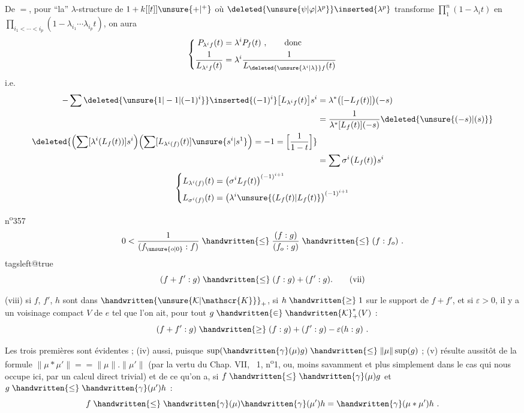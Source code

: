 De $=$, pour ``la'' $\lambda$-structure de $1+k[[t]]\unsure{+|{}^{+}}$ où $\deleted{\unsure{\psi|\varphi|\lambda^p}}\inserted{\lambda^p}$ transforme $\prod_{1}^{n}(1-\lambda_i t)$ en $\prod_{i_1<\cdots<i_p}(1-\lambda_{i_1}\cdots\lambda_{i_p}t)$, on aura
\[
\left\{\begin{aligned}
P_{\lambda^i f}(t)&=\lambda^i P_f(t)\ ,\qquad\text{donc}\\
\frac{1}{L_{\lambda^i f}(t)}&=\lambda^i\frac{1}{L_{\deleted{\unsure{\lambda^i|\lambda}}f}(t)}
\end{aligned}\right.
\]
i.e.
\[
\begin{aligned}
-\sum\deleted{\unsure{1|-1|(-1)^i}}\inserted{(-1)^i}\bigl[L_{\lambda^i f}(t)\bigr]s^i
 &=\lambda^\ast\bigl([-L_f(t)]\bigr)(-s)\\
 &=\frac{1}{\lambda^\ast[L_f(t)](-s)}\deleted{\unsure{(-s)|(s)}}\\
\deleted{\Bigl(\sum[\lambda^i(L_f(t))]s^i\Bigr)\Bigl(\sum[L_{\lambda^i(f)}(t)]\unsure{s^i|s^1}\Bigr)=-1=\Bigl[\frac{1}{1-t}\Bigr]}&\\
 &=\sum\sigma^i\bigl(L_f(t)\bigr)s^i
\end{aligned}
\]
\[
\left\{\begin{aligned}
L_{\lambda^i(f)}(t)&=\bigl(\sigma^i L_f(t)\bigr)^{(-1)^{i+1}}\\
L_{\sigma^i(f)}(t)&=\bigl(\lambda^i\unsure{(L_f(t)|L_f(t)}\bigr)^{(-1)^{i+1}}
\end{aligned}\right.
\]

n\textsuperscript{o}357
\[
0<\frac{1}{(f_{\unsure{o|0}}:f)}\mathrel{\handwritten{\leq}}\frac{(f:g)}{(f_o:g)}\mathrel{\handwritten{\leq}}(f:f_o)\ .
\]
\begingroup\csname tagsleft@true\endcsname\[
(f+f':g)\mathrel{\handwritten{\leq}}(f:g)+(f':g).\tag*{(vii)}
\]\endgroup

(viii) \quad si $f$, $f'$, $h$ sont dans $\handwritten{\unsure{\mathcal{K}|\mathscr{K}}}_+$, si $h\mathrel{\handwritten{\geq}}1$ sur le support de $f+f'$, et si $\varepsilon>0$, il y a un voisinage compact $V$ de $e$ tel que l'on ait, pour tout $g\mathrel{\handwritten{\in}}\handwritten{\mathcal{K}}^{\ast}_{+}(V)$ :
\[
(f+f':g)\mathrel{\handwritten{\geq}}(f:g)+(f':g)-\varepsilon(h:g)\ .
\]

Les trois premières sont évidentes ; (iv) aussi, puisque $\sup(\handwritten{\gamma}(\mu)g)\mathrel{\handwritten{\leq}}\lVert\mu\rVert\sup(g)$ ; (v) résulte aussitôt de la formule $\lVert\mu\ast\mu'\rVert={ }=\lVert\mu\rVert.\lVert\mu'\rVert$ (par la vertu du Chap. VII, \handwritten{\S}\ 1, n\textsuperscript{o}1, ou, moins savamment et plus simplement dans le cas qui nous occupe ici, par un calcul direct trivial) et de ce qu'on a, si $f\mathrel{\handwritten{\leq}}\handwritten{\gamma}(\mu)g$ et $g\mathrel{\handwritten{\leq}}\handwritten{\gamma}(\mu')h$ :
\[
f\mathrel{\handwritten{\leq}}\handwritten{\gamma}(\mu)\handwritten{\gamma}(\mu')h=\handwritten{\gamma}(\mu\ast\mu')h\ .
\]

